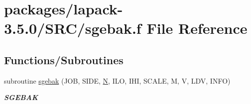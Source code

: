 \hypertarget{sgebak_8f}{}\section{packages/lapack-\/3.5.0/\+S\+R\+C/sgebak.f File Reference}
\label{sgebak_8f}
\subsection*{Functions/\+Subroutines}
\begin{DoxyCompactItemize}
\item 
subroutine \hyperlink{group__realGEcomputational_gad036a50aafd810967583ed8854e6cd3a}{sgebak} (J\+O\+B, S\+I\+D\+E, \hyperlink{polmisc_8c_a0240ac851181b84ac374872dc5434ee4}{N}, I\+L\+O, I\+H\+I, S\+C\+A\+L\+E, M, V, L\+D\+V, I\+N\+F\+O)
\begin{DoxyCompactList}\small\item\em {\bfseries S\+G\+E\+B\+A\+K} \end{DoxyCompactList}\end{DoxyCompactItemize}

